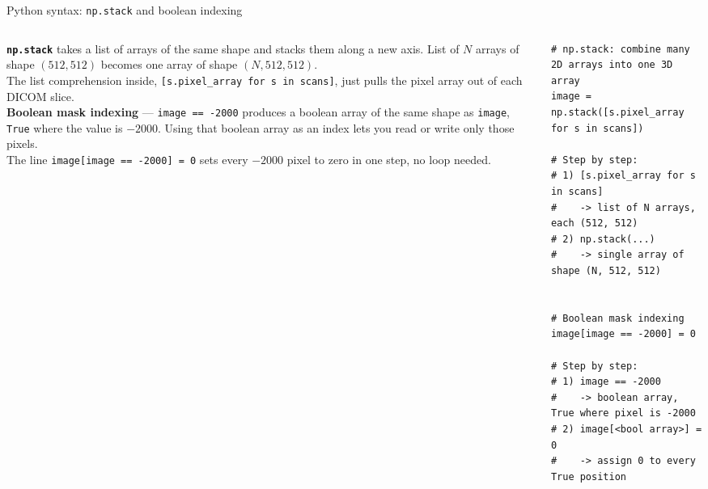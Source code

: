 \documentclass[10pt,aspectratio=169]{beamer}
\begin{document}
\begin{frame}[fragile]{Python syntax: \texttt{np.stack} and boolean indexing}
\begin{columns}[T,onlytextwidth]
\begin{column}{0.42\textwidth}
\small
\textbf{\texttt{np.stack}} takes a list of arrays of the same shape and stacks them along a new axis. List of $N$ arrays of shape $(512, 512)$ becomes one array of shape $(N, 512, 512)$.\\[0.4em]
The list comprehension inside, \texttt{[s.pixel\_array for s in scans]}, just pulls the pixel array out of each DICOM slice.\\[0.4em]
\textbf{Boolean mask indexing} — \texttt{image == -2000} produces a boolean array of the same shape as \texttt{image}, \texttt{True} where the value is $-2000$. Using that boolean array as an index lets you read or write only those pixels.\\[0.4em]
The line \texttt{image[image == -2000] = 0} sets every $-2000$ pixel to zero in one step, no loop needed.
\end{column}
\begin{column}{0.56\textwidth}
\begin{lstlisting}[stepnumber=0]
# np.stack: combine many 2D arrays into one 3D array
image = np.stack([s.pixel_array for s in scans])

# Step by step:
# 1) [s.pixel_array for s in scans]
#    -> list of N arrays, each (512, 512)
# 2) np.stack(...)
#    -> single array of shape (N, 512, 512)


# Boolean mask indexing
image[image == -2000] = 0

# Step by step:
# 1) image == -2000
#    -> boolean array, True where pixel is -2000
# 2) image[<bool array>] = 0
#    -> assign 0 to every True position
\end{lstlisting}
\end{column}
\end{columns}
\end{frame}
\end{document}
